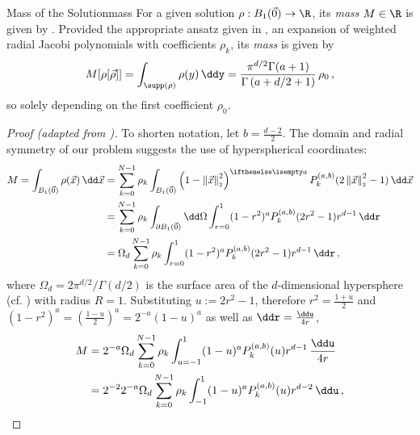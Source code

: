 \begin{lemma}{Mass of the Solution}{mass}
  For a given solution $\rho: B_1(\vec{0}) \to \R$, its \textit{mass} $M \in \R$ is given by .
  Provided the appropriate ansatz given in , an expansion of weighted radial Jacobi polynomials with coefficients $\rho_k$, its \textit{mass} is given by
  \begin{align*}
    M[\rho[\vec{\rho}]] = \int_{\supp(\rho)} \rho(y) \,\ddy = \frac{\pi^{{d/2}}\Gamma (a+1)}{\Gamma \left(a+{d/2}+1\right)}\, \rho_0\,,
  \end{align*}
  so solely depending on the first coefficient $\rho_0$.
\end{lemma}
\begin{proof}[Proof (adapted from \cite{2021-arbitrary-dimensions})]
  To shorten notation, let $b = \frac{d-2}{2}$.
  The domain and radial symmetry of our problem suggests the use of hyperspherical coordinates:
  \begin{align*}
    M = \int_{B_1(\vec{0})} \rho(\vec{x}) \,\dd\vec{x} & = \sum_{k=0}^{N-1} \rho_k \int_{B_1(\vec{0})} \weight{x} P_k^{(a,b)}(\jacobiarg{x}) \,\dd\vec{x}                          \\
                                                       & =\sum_{k=0}^{N-1} \rho_k \int_{\partial B_1(\vec{0})} \dd\Omega \int_{r=0}^1 (1-r^2)^a P_k^{(a,b)}(2r^2-1) r^{d-1} \,\ddr \\
                                                       & = \Omega_d \sum_{k=0}^{N-1} \rho_k \int_{r=0}^1 (1-r^2)^a P_k^{(a,b)}(2r^2-1) r^{d-1} \,\ddr\,,
  \end{align*}
  where $\Omega_d = {2\pi^{d/2}} / {\Gamma({d/2})}$ is the surface area of the $d$-dimensional hypersphere (cf. ) with radius $R = 1$.
  Substituting $u := 2r^2-1$, therefore $r^2 = \frac{1+u}{2}$ and $(1-r^2)^a = \left(\frac{1-u}{2}\right)^a = 2^{-a} (1-u)^a$ as well as $\ddr = \frac{\ddu}{4r}$,
  \begin{align*}
    M & = 2^{-a} \Omega_d \sum_{k=0}^{N-1} \rho_k \int_{u=-1}^1 (1-u)^a P_k^{(a,b)}(u) r^{d-1} \,\frac{\ddu}{4r} \\
      & = 2^{-2} 2^{-a} \Omega_d \sum_{k=0}^{N-1} \rho_k \int_{-1}^1 (1-u)^a P_k^{(a,b)}(u) r^{d-2}\,\ddu\,,

\end{align*}
\end{proof}
